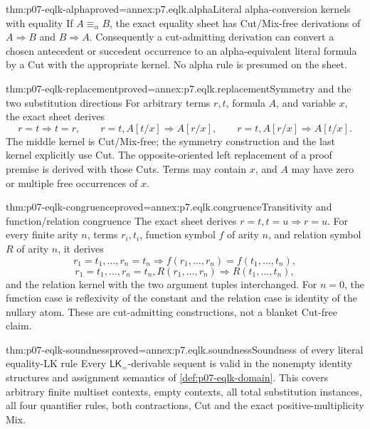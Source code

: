 \begin{hblemma}{thm:p07-eqlk-alpha}{proved=annex:p7.eqlk.alpha}{Literal alpha-conversion kernels with equality}
If \(A\equiv_\alpha B\), the exact equality sheet has Cut/Mix-free
derivations of \(A\Rightarrow B\) and \(B\Rightarrow A\).
Consequently a cut-admitting derivation can convert a chosen antecedent
or succedent occurrence to an alpha-equivalent literal formula by a Cut
with the appropriate kernel. No alpha rule is presumed on the sheet.
\end{hblemma}

\begin{hblemma}{thm:p07-eqlk-replacement}{proved=annex:p7.eqlk.replacement}{Symmetry and the two substitution directions}
For arbitrary terms \(r,t\), formula \(A\), and variable \(x\),
the exact sheet derives
\[
 r=t\Rightarrow t=r,
 \qquad
 r=t,A[t/x]\Rightarrow A[r/x],
 \qquad
 r=t,A[r/x]\Rightarrow A[t/x].
\]
The middle kernel is Cut/Mix-free; the symmetry construction and the
last kernel explicitly use Cut. The opposite-oriented left replacement
of a proof premise is derived with those Cuts. Terms may contain \(x\),
and \(A\) may have zero or multiple free occurrences of \(x\).
\end{hblemma}

\begin{hbtheorem}{thm:p07-eqlk-congruence}{proved=annex:p7.eqlk.congruence}{Transitivity and function/relation congruence}
The exact sheet derives \(r=t,t=u\Rightarrow r=u\).
For every finite arity \(n\), terms \(r_i,t_i\), function symbol \(f\)
of arity \(n\), and relation symbol \(R\) of arity \(n\), it derives
\[
 r_1=t_1,\ldots,r_n=t_n
 \Rightarrow f(r_1,\ldots,r_n)=f(t_1,\ldots,t_n),
\]
\[
 r_1=t_1,\ldots,r_n=t_n,R(r_1,\ldots,r_n)
 \Rightarrow R(t_1,\ldots,t_n),
\]
and the relation kernel with the two argument tuples interchanged.
For \(n=0\), the function case is reflexivity of the constant and the
relation case is identity of the nullary atom. These are cut-admitting
constructions, not a blanket Cut-free claim.
\end{hbtheorem}

\begin{hbtheorem}{thm:p07-eqlk-soundness}{proved=annex:p7.eqlk.soundness}{Soundness of every literal equality-LK rule}
Every \(\mathsf{LK}_{=}\)-derivable sequent is valid in the nonempty
identity structures and assignment semantics of
\cref{def:p07-eqlk-domain}. This covers arbitrary finite multiset contexts,
empty contexts, all total substitution instances, all four quantifier
rules, both contractions, Cut and the exact positive-multiplicity Mix.
\end{hbtheorem}

